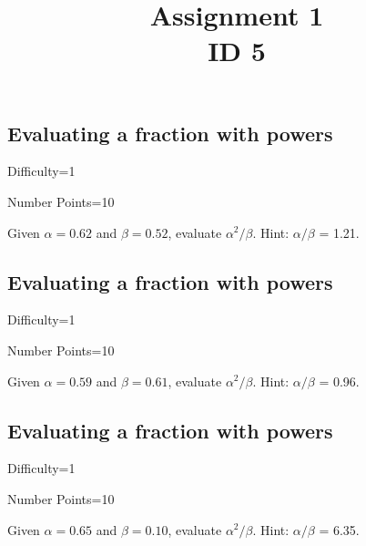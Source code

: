 \documentclass{article}
\title{Assignment 1 \\ ID 5}
\begin{document}
\maketitle

\section{} 



\subsection{Evaluating a fraction with powers}

Difficulty=1

Number Points=10

Given $\alpha = 0.62$ and $\beta = 0.52$, evaluate $\alpha^{2}/\beta$. Hint: $\alpha/\beta$ = 1.21.

\subsection{Evaluating a fraction with powers}

Difficulty=1

Number Points=10

Given $\alpha = 0.59$ and $\beta = 0.61$, evaluate $\alpha^{2}/\beta$. Hint: $\alpha/\beta$ = 0.96.

\subsection{Evaluating a fraction with powers}

Difficulty=1

Number Points=10

Given $\alpha = 0.65$ and $\beta = 0.10$, evaluate $\alpha^{2}/\beta$. Hint: $\alpha/\beta$ = 6.35.
\end{document}
